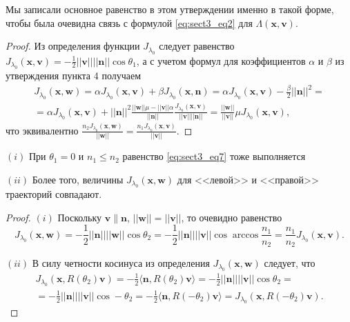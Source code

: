 \begin{statement}
Мы записали основное равенство в этом утверждении именно в такой форме, чтобы  была очевидна связь с формулой \eqref{eq:sect3_eq2} для $\Lambda(\mathbf{x}, \mathbf{v})$.
\end{statement}
\begin{proof}
Из определения функции $J_{\lambda_0}$ следует равенство $J_{\lambda_0}(\mathbf{x}, \mathbf{v}) = -\frac{1}{2}||\mathbf{v}|| ||\mathbf{n}|| \cos \theta_1$, а с учетом формул для коэффициентов $\alpha$ и $\beta$ из утверждения пункта 4 получаем 
\begin{multline*}
    J_{\lambda_0}(\mathbf{x}, \mathbf{w}) = \alpha J_{\lambda_0}(\mathbf{x}, \mathbf{v}) + \beta J_{\lambda_0}(\mathbf{x}, \mathbf{n}) = \alpha J_{\lambda_0}(\mathbf{x}, \mathbf{v}) - \frac{\beta}{2}||\mathbf{n}||^2 = \\ =\alpha J_{\lambda_0}(\mathbf{x}, \mathbf{v}) + ||\mathbf{n}||^2\frac{||\mathbf{w}||\mu-||\mathbf{v}||\alpha}{||\mathbf{n}||}\frac{J_{\lambda_0}(\mathbf{x}, \mathbf{v})}{||\mathbf{v}|| ||\mathbf{n}||} = 
\frac{||\mathbf{w}||}{||\mathbf{v}||}\mu J_{\lambda_0}(\mathbf{x}, \mathbf{v}),
\end{multline*}
что эквивалентно
$
\frac{n_2 J_{\lambda_0}(\mathbf{x}, \mathbf{w})}{||\mathbf{w}||} = 
\frac{n_1 J_{\lambda_0}(\mathbf{x}, \mathbf{v})}{||\mathbf{v}||}.
$
\end{proof}

\begin{statement}
    
    $(i)$ При $\theta_1=0$ и $n_1 \leq n_2$ равенство
    \eqref{eq:sect3_eq7} тоже выполняется 
    
    $(ii)$ Более того, величины $J_{\lambda_0}(\mathbf{x}, \mathbf{w})$ для <<левой>> и <<правой>> траекторий совпадают.
\end{statement}
\begin{proof}

$(i)$ Поскольку $\mathbf{v} \| \mathbf{n}$, $||\mathbf{w}|| = ||\mathbf{v}||$,  то очевидно равенство 
    $$J_{\lambda_0}(\mathbf{x}, \mathbf{w}) 
    = -\frac{1}{2}||\mathbf{n}||||\mathbf{w}|| \cos \theta_2 
    = -\frac{1}{2}||\mathbf{n}||||\mathbf{v}|| \cos \arccos \frac{n_1}{n_2} 
    = \frac{n_1}{n_2} J_{\lambda_0}(\mathbf{x}, \mathbf{v}).$$

$(ii)$ В силу четности косинуса из определения $J_{\lambda_0}(\mathbf{x}, \mathbf{w})$ следует, что
\begin{multline*}
J_{\lambda_0}(\mathbf{x}, R(\theta_2) \mathbf{v})
=-\frac{1}{2}\langle\mathbf{n},  R(\theta_2) \mathbf{v}\rangle
=-\frac{1}{2}||\mathbf{n}||||\mathbf{v}|| \cos \theta_2 = \\
=-\frac{1}{2}||\mathbf{n}||||\mathbf{v}|| \cos -\theta_2 
=-\frac{1}{2}\langle\mathbf{n},  R(-\theta_2) \mathbf{v}\rangle
=J_{\lambda_0}(\mathbf{x}, R(-\theta_2) \mathbf{v}).
\end{multline*}
\end{proof}

